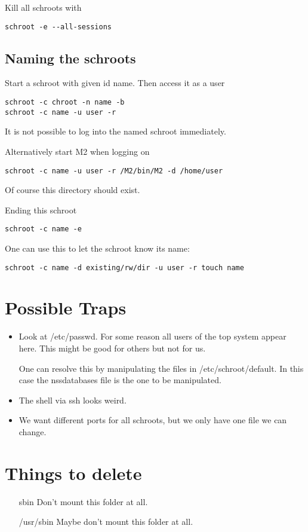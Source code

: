 \documentclass[a4paper]{book}
\begin{document}
Kill all schroots with

\begin{verbatim}
schroot -e --all-sessions
\end{verbatim}

\subsection{Naming the schroots}
Start a schroot with given id name. Then access it as a user

\begin{verbatim}
schroot -c chroot -n name -b
schroot -c name -u user -r
\end{verbatim}

It is not possible to log into the named schroot immediately.

Alternatively start M2 when logging on

\begin{verbatim}
schroot -c name -u user -r /M2/bin/M2 -d /home/user 
\end{verbatim}

Of course this directory should exist.

Ending this schroot
\begin{verbatim}
schroot -c name -e
\end{verbatim}

One can use this to let the schroot know its name:

\begin{verbatim}
schroot -c name -d existing/rw/dir -u user -r touch name
\end{verbatim}

\section{Possible Traps}
\begin{itemize}
\item Look at /etc/passwd. For some reason all users of the top system appear
  here. This might be good for others but not for us.

One can resolve this by manipulating the files in /etc/schroot/default. In this
case the nssdatabases file is the one to be manipulated.
\item The shell via ssh looks weird.
\item We want different ports for all schroots, but we only have one file we can change.
\end{itemize}

\section{Things to delete}
\begin{itemize}
\item[sbin] Don't mount this folder at all.
\item[/usr/sbin] Maybe don't mount this folder at all.
\end{itemize}
\end{document}
